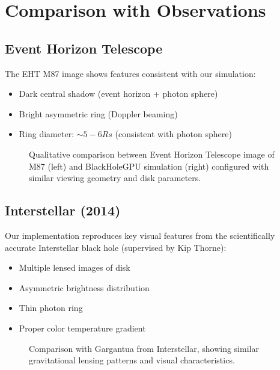 \documentclass[12pt,a4paper]{article}
\theoremstyle{definition}
\theoremstyle{remark}
\begin{document}
\section{Comparison with Observations}

\subsection{Event Horizon Telescope}

The EHT M87 image shows features consistent with our simulation:

\begin{itemize}
    \item Dark central shadow (event horizon + photon sphere)
    \item Bright asymmetric ring (Doppler beaming)
    \item Ring diameter: $\sim 5-6 Rs$ (consistent with photon sphere)
\end{itemize}

\begin{figure}[H]
    \centering
    \caption{Qualitative comparison between Event Horizon Telescope image of M87 (left) and BlackHoleGPU simulation (right) configured with similar viewing geometry and disk parameters.}
    \label{fig:eht_comparison}
\end{figure}

\subsection{Interstellar (2014)}

Our implementation reproduces key visual features from the scientifically accurate Interstellar black hole (supervised by Kip Thorne):

\begin{itemize}
    \item Multiple lensed images of disk
    \item Asymmetric brightness distribution
    \item Thin photon ring
    \item Proper color temperature gradient
\end{itemize}

\begin{figure}[H]
    \centering
    \caption{Comparison with Gargantua from Interstellar, showing similar gravitational lensing patterns and visual characteristics.}
    \label{fig:interstellar_comparison}
\end{figure}
\end{document}
